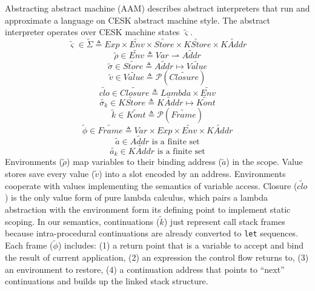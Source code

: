 \documentclass{article}
\begin{document}
Abstracting abstract machine (AAM) describes abstract interpreters that run and approximate a language on CESK abstract machine style.
The abstract interpreter operates over CESK machine states $\widetilde{\varsigma}$.
\[
\tag{states}
\widetilde{\varsigma}\in\widetilde{\Sigma} \triangleq Exp \times \widetilde{Env} \times \widetilde{Store}
\times \widetilde{KStore} \times \widetilde{KAddr}
\]
\[
\tag{environments}
\widetilde{\rho} \in \widetilde{Env} \triangleq Var \rightharpoonup \widetilde{Addr}
\]
\[
\tag{stores}
\widetilde{\sigma} \in \widetilde{Store} \triangleq \widetilde{Addr} \mapsto \widetilde{Value}
\]
\[
\tag{abstract values}
\widetilde{v} \in \widetilde{Value} \triangleq \mathcal{P}(\widetilde{Closure})
\]
\[
\tag{closures}
\widetilde{clo} \in \widetilde{Closure} \triangleq Lambda \times \widetilde{Env}
\]
\[
\tag{continuation stores}
\widetilde{\sigma_k} \in \widetilde{KStore} \triangleq  \widetilde{KAddr} \mapsto  \widetilde{Kont}
\]
\[
\tag{abstract continuations}
\widetilde{k} \in  \widetilde{Kont} \triangleq  \mathcal{P}(\widetilde{Frame})
\]
\[
\tag{stack frames}
\widetilde{\phi} \in  \widetilde{Frame} \triangleq Var \times Exp \times  \widetilde{Env} \times  \widetilde{KAddr}
\]
\[
\tag{value addresses}
\widetilde{a} \in \widetilde{Addr} \mbox{ is a finite set}
\]
\[
\tag{continuation addresses}
\widetilde{a_k} \in \widetilde{KAddr} \mbox{ is a finite set}
\]
Environments ($\widetilde{\rho}$) map variables to their binding address ($\widetilde{a}$) in the scope. Value stores save every value ($\widetilde{v}$) into a slot encoded by an address. Environments cooperate with values implementing the semantics of variable access.
Closure ($\widetilde{clo}$) is the only value form of pure lambda calculus, which pairs a lambda abstraction with the environment form its defining point to implement static scoping.
In our semantics, continuations ($\widetilde{k}$) just represent call stack frames because intra-procedural continuations are already converted to \verb|let| sequences.
Each frame ($\widetilde{\phi}$) includes:
(1) a return point that is a variable to accept and bind the result of current application,
(2) an expression the control flow returns to,
(3) an environment to restore,
(4) a continuation address that points to ``next'' continuations and builds up the linked stack structure.
\end{document}
